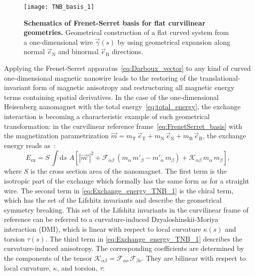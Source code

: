 \begin{figure}[t]
	\centering
	\texttt{[image: TNB\_basis\_1]}
	\caption{\label{fig:TNB}%
		\textbf{Schematics of Frenet-Serret basis for flat curvilinear geometries.} Geometrical construction of a flat curved system from a one-dimensional wire $\vec{\gamma}(s)$ by using geometrical expansion along normal $\vec{e}_\textrm{N}$ and binormal $\vec{e}_\textrm{B}$ directions. 
	}
\end{figure}

Applying the Frenet-Serret apparatus~\eqref{eq:Darboux_vector} to any kind of curved one-dimensional magnetic nanowire leads to the restoring of the translational-invariant form of magnetic anisotropy and restructuring all magnetic energy terms containing spatial derivatives. In the case of the one-dimensional Heisenberg nanomagnet with the total energy~\eqref{eq:total_energy}, the exchange interaction is becoming a characteristic example of such geometrical transformation: in the curvilinear reference frame~\eqref{eq:FrenetSerret_basis} with the magnetization parametrization $\vec{m} = m_\textrm{T}\,\vec{e}_\textrm{T} + m_\textrm{N}\,\vec{e}_\textrm{N} + m_\textrm{B}\,\vec{e}_\textrm{B}$, the exchange energy reads as~\cite{Sheka15}:
\begin{equation} \label{eq:Exchange_energy_TNB_1}
E_{\textrm{ex}} = S \, \int \textrm{d} s  \, \, A \left[ \left| \vec{m}' \right|^2 + \mathcal{F}_{\alpha \beta} \, ( m_{\alpha} \, m'_{\beta} - m'_{\alpha} \, m_{\beta} ) + \mathcal{K}_{\alpha \beta} \, m_{\alpha} \, m_{\beta} \right],
\end{equation}
where $S$ is the cross section area of the nanomagnet. The first term is the isotropic part of the exchange which formally  has the same form as for a straight wire. The second term in \eqref{eq:Exchange_energy_TNB_1} is the chiral term, which has the set of the Lifshitz invariants and describe the geometrical symmetry breaking. This set of the Lifshitz invariants in the curvilinear frame of reference can be referred to a curvature-induced Dzyaloshinskii-Moriya interaction (DMI), which is linear with respect to local curvature $\kappa(s)$ and torsion $\tau(s)$. The third term in \eqref{eq:Exchange_energy_TNB_1} describes the curvature-induced anisotropy. The corresponding coefficients are determined by the components of the tensor $\mathcal{K}_{\alpha \beta}= \mathcal{F}_{\alpha \nu} \, \mathcal{F}_{\beta \nu}$. They are bilinear with respect to local curvature, $\kappa$, and torsion, $\tau$:
